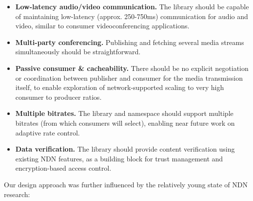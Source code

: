 \documentclass{icn/sig-alternate-2013} %
\begin{document}

\begin{itemize}

\item \textbf{Low-latency audio/video communication.} The library should be capable of maintaining low-latency (approx. 250-750ms) communication for audio and video, similar to consumer videoconferencing applications.

\item \textbf{Multi-party conferencing.} Publishing and fetching several media streams simultaneously should be straightforward.

\item \textbf{Passive consumer \& cacheability.} There should be no explicit negotiation or coordination between publisher and consumer for the media transmission itself, to enable exploration of network-supported scaling to very high consumer to producer ratios.  

\item \textbf{Multiple bitrates.} The library and namespace should support multiple bitrates (from which consumers will select), enabling near future
work on adaptive rate control. 

\item \textbf{Data verification.} The library should provide content verification using existing NDN features, as a building block for trust management and encryption-based access control.  

\end{itemize} 


Our design approach was further influenced by the relatively young state of NDN research: 
\end{document}
